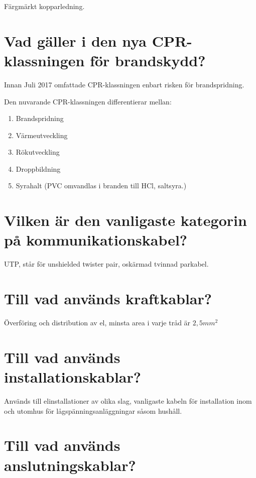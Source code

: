 \documentclass[a4paper,swedish]{article}
\begin{document}
Färgmärkt kopparledning.

\section{Vad gäller i den nya CPR-klassningen för brandskydd?}

Innan Juli 2017 omfattade CPR-klassningen enbart risken för brandspridning.

Den nuvarande CPR-klassningen differentierar mellan:

\begin{center}
  \begin{enumerate}
  \item Brandspridning
  \item Värmeutveckling
  \item Rökutveckling
  \item Droppbildning
  \item Syrahalt (PVC omvandlas i branden till HCl, saltsyra.)
  \end{enumerate}
\end{center}

\section{Vilken är den vanligaste kategorin på kommunikationskabel?}
\label{sec:q_m_22}

UTP, står för unshielded twister pair, oskärmad tvinnad parkabel.

\section{Till vad används kraftkablar?}

Överföring och distribution av el, minsta area i varje tråd är $2,5 mm^2$

\section{Till vad används installationskablar?}
\label{sec:q_m_24}

Används till elinstallationer av olika slag, vanligaste kabeln för installation inom och utomhus för lågspänningsanläggningar såsom hushåll.

\section{Till vad används anslutningskablar?}
\end{document}
